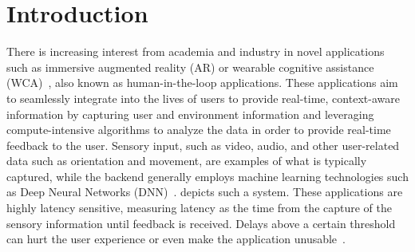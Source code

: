 \section{Introduction}\label{sec:intro}

There is increasing interest from academia and industry in novel applications such as immersive augmented reality (AR) or wearable cognitive assistance (WCA)~\cite{Chatzopoulos:Hyperion,Ha:TowardsWearableCogAssist}, also known as human-in-the-loop applications.
These applications aim to seamlessly integrate into the lives of users to provide real-time, context-aware information by capturing user and environment information and leveraging compute-intensive algorithms to analyze the data in order to provide real-time feedback to the user.
Sensory input, such as video, audio, and other user-related data such as orientation and movement, are examples of what is typically captured, while the backend generally employs machine learning technologies such as Deep Neural Networks (DNN)~\cite{Ha:TowardsWearableCogAssist}.
 depicts such a system.
These applications are highly latency sensitive, measuring latency as the time from the capture of the sensory information until feedback is received.
Delays above a certain threshold can hurt the user experience or even make the application unusable~\cite{Chen:AnEmpiricalStudyOfLatency}.

